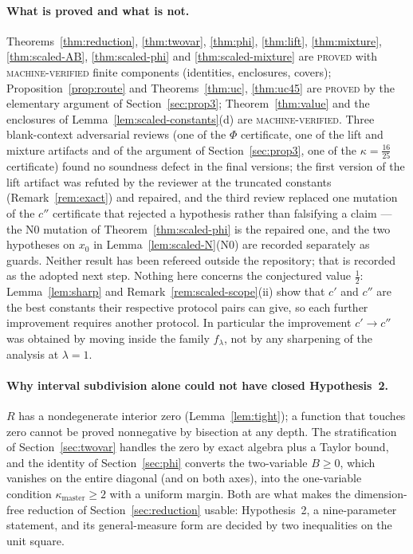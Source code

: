 \documentclass[11pt]{article}
\theoremstyle{plain}
\theoremstyle{definition}
\theoremstyle{remark}
\newcommand{\lbl}[1]{\textsc{#1}}
\begin{document}
\paragraph{What is proved and what is not.}
Theorems~\ref{thm:reduction}, \ref{thm:twovar}, \ref{thm:phi},
\ref{thm:lift}, \ref{thm:mixture}, \ref{thm:scaled-AB},
\ref{thm:scaled-phi} and \ref{thm:scaled-mixture} are \lbl{proved} with
\lbl{machine-verified} finite components (identities, enclosures, covers);
Proposition~\ref{prop:route} and Theorems~\ref{thm:uc}, \ref{thm:uc45} are
\lbl{proved} by the elementary argument of
Section~\ref{sec:prop3}; Theorem~\ref{thm:value} and the enclosures of
Lemma~\ref{lem:scaled-constants}(d) are
\lbl{machine-verified}.  Three blank-context adversarial reviews (one of the
$\Phi$ certificate, one of the lift and mixture artifacts and of the
argument of Section~\ref{sec:prop3}, one of the $\kappa=\tfrac{16}{25}$
certificate) found no soundness defect in the final
versions; the first version of the lift artifact was refuted by the
reviewer at the truncated constants (Remark~\ref{rem:exact}) and repaired,
and the third review replaced one mutation of the $c''$ certificate that
rejected a hypothesis rather than falsifying a claim --- the N0 mutation of
Theorem~\ref{thm:scaled-phi} is the repaired one, and the two hypotheses on
$x_0$ in Lemma~\ref{lem:scaled-N}(N0) are recorded separately as guards.
Neither result has been refereed outside the repository; that is recorded
as the adopted next step.  Nothing here concerns the conjectured value
$\tfrac12$: Lemma~\ref{lem:sharp} and Remark~\ref{rem:scaled-scope}(ii) show
that $c'$ and $c''$ are the best constants their respective protocol pairs
can give, so each further improvement requires another protocol.  In
particular the improvement $c'\to c''$ was obtained by moving inside the
family $f_\lambda$, not by any sharpening of the analysis at $\lambda=1$.

\paragraph{Why interval subdivision alone could not have closed
Hypothesis~2.}
$R$ has a nondegenerate interior zero (Lemma~\ref{lem:tight}); a function
that touches zero cannot be proved nonnegative by bisection at any depth.
The stratification of Section~\ref{sec:twovar} handles the zero by exact
algebra plus a Taylor bound, and the identity of Section~\ref{sec:phi}
converts the two-variable $B\ge0$, which vanishes on the entire diagonal
(and on both axes), into the one-variable condition $\kappa_{\mathrm{master}}\ge2$ with a
uniform margin.  Both are
what makes the dimension-free reduction of Section~\ref{sec:reduction}
usable: Hypothesis~2, a nine-parameter statement, and its general-measure
form are decided by two inequalities on the unit square.
\end{document}

